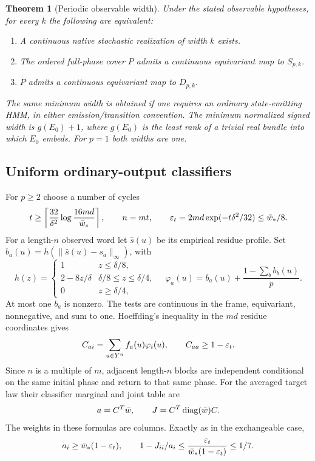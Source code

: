 \documentclass[11pt]{article}
\newtheorem{theorem}{Theorem}
\theoremstyle{remark}\newtheorem{remark}[theorem]{Remark}
\begin{document}
\begin{theorem}[Periodic observable width]\label{thm:width}
Under the stated observable hypotheses, for every $k$ the following are equivalent:
\begin{enumerate}
\item A continuous native stochastic realization of width $k$ exists.
\item The ordered full-phase cover $P$ admits a continuous equivariant map to $S_{p,k}$.
\item $P$ admits a continuous equivariant map to $D_{p,k}$.
\end{enumerate}
The same minimum width is obtained if one requires an ordinary state-emitting HMM, in either emission/transition convention. The minimum normalized signed width is $g(E_0)+1$, where $g(E_0)$ is the least rank of a trivial real bundle into which $E_0$ embeds. For $p=1$ both widths are one.
\end{theorem}

\subsection{Uniform ordinary-output classifiers}
For $p\geq2$ choose a number of cycles
\begin{equation}\label{eq:cycles}
t\geq\left\lceil\frac{32}{\delta^2}\log\frac{16md}{\bar w_*}\right\rceil,
\qquad n=mt,\qquad \varepsilon_t=2md\exp(-t\delta^2/32)\leq\bar w_*/8.
\end{equation}
For a length-$n$ observed word let $\widehat s(u)$ be its empirical residue profile. Set $b_a(u)=h(\|\widehat s(u)-s_a\|_\infty)$, with
\[
h(z)=\begin{cases}1&z\leq\delta/8,\\2-8z/\delta&\delta/8\leq z\leq\delta/4,\\0&z\geq\delta/4,\end{cases}
\quad
\varphi_a(u)=b_a(u)+\frac{1-\sum_b b_b(u)}p.
\]
At most one $b_a$ is nonzero. The tests are continuous in the frame, equivariant, nonnegative, and sum to one. Hoeffding's inequality in the $md$ residue coordinates gives
\[
C_{ai}=\sum_{u\in Y^n}f_a(u)\varphi_i(u),\qquad C_{aa}\geq1-\varepsilon_t.
\]
Since $n$ is a multiple of $m$, adjacent length-$n$ blocks are independent conditional on the same initial phase and return to that same phase. For the averaged target law their classifier marginal and joint table are
\[
a=C^T\bar w,\qquad J=C^T\operatorname{diag}(\bar w)C.
\]
The weights in these formulas are columns. Exactly as in the exchangeable case,
\[
a_i\geq\bar w_*(1-\varepsilon_t),\qquad
1-J_{ii}/a_i\leq\frac{\varepsilon_t}{\bar w_*(1-\varepsilon_t)}\leq1/7.
\]
\end{document}
